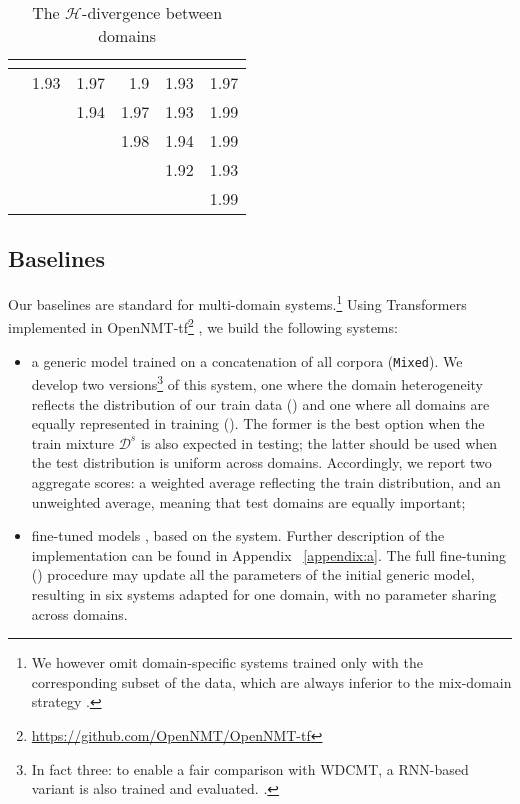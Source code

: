 \begin{table}\centering
  \begin{tabular}{|l*{5}{|r}|} 
   &  &  &  &  &  \\ \hline
     &1.93 &1.97 &1.9 &1.93 &1.97 \\
       && 1.94 & 1.97 &1.93 & 1.99 \\
     &&&1.98 &1.94 &1.99 \\
       &&&&1.92 &1.93 \\
          &&&&& 1.99 \\ \hline
  \end{tabular}
  \caption{The $\mathcal{H}$-divergence between domains}
  \label{tab:domaindist-chap4}
\end{table}

\subsection{Baselines \label{ssec:baselines-chap4}}

Our baselines are standard for multi-domain systems.\footnote{We however omit domain-specific systems trained only with the corresponding subset of the data, which are always inferior to the mix-domain strategy \citep{Britz17effective}.} Using Transformers \citep{Vaswani17attention} implemented in OpenNMT-tf\footnote{\url{https://github.com/OpenNMT/OpenNMT-tf}} \citep{Klein17opennmt}, we build the following systems:

\begin{itemize}
\item a generic model trained on a concatenation of all corpora (\texttt{Mixed}). We develop two versions\footnote{In fact three: to enable a fair comparison with WDCMT, a RNN-based variant is also trained and evaluated. .} of this system, one where the domain heterogeneity reflects the distribution of our train data  () and one where all domains are equally represented in training (). The former is the best option when the train mixture $\mathcal{D}^s$ is also expected in testing; the latter should be used when the test distribution is uniform across domains. Accordingly, we report two aggregate scores: a weighted average reflecting the train distribution, and an unweighted average, meaning that test domains are equally important;
\item fine-tuned models \citep{Luong15stanford,Freitag16fast}, based on the  system. Further description of the implementation can be found in Appendix ~\ref{appendix:a}. The full fine-tuning () procedure may update all the parameters of the initial generic model, resulting in six systems adapted for one domain, with no parameter sharing across domains.
\end{itemize}

